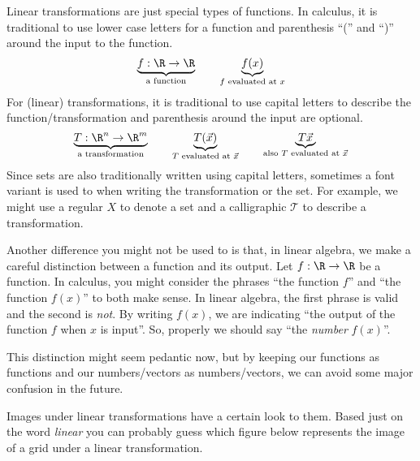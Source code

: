 
Linear transformations are just special types of functions. In calculus, it is traditional to use lower case
letters for a function and parenthesis ``('' and ``)'' around the input to the function.
\[
	\underbrace{f:\R\to\R}_{\text{a function}}\qquad \underbrace{f(x)}_{\text{$f$ evaluated at $x$}}
\]
For (linear) transformations, it is traditional to use capital letters to describe the function/transformation
and parenthesis around the input are optional.
\[
	\underbrace{T:\R^n\to\R^m}_{\text{a transformation}}\qquad \underbrace{T(\vec x)}_{\text{$T$ evaluated at $\vec x$}}
	\qquad
	\underbrace{T\vec x}_{\text{also $T$ evaluated at $\vec x$}}
\]
Since sets are also traditionally written using capital letters, sometimes a font variant is used to when writing the transformation
or the set. For example, we might use a regular $X$ to denote a set and a calligraphic $\mathcal T$ to describe a transformation.

\bigskip

Another difference you might not be used to is that, in linear algebra, we make a careful distinction between
a function and its output. Let $f:\R\to\R$ be a function. In calculus, you might consider the phrases ``the function $f$''
and ``the function $f(x)$'' to both make sense. In linear algebra, the first phrase is valid and the second is \emph{not}. By writing
$f(x)$, we are indicating ``the output of the function $f$ when $x$ is input''. So, properly we should say ``the \emph{number} $f(x)$''.

This distinction might seem pedantic now, but by keeping our functions as functions and our numbers/vectors as numbers/vectors,
we can avoid some major confusion in the future.



Images under linear transformations have a certain look to them. Based just on the word
\emph{linear} you can probably guess which figure below represents the image of a grid under
a linear transformation.

